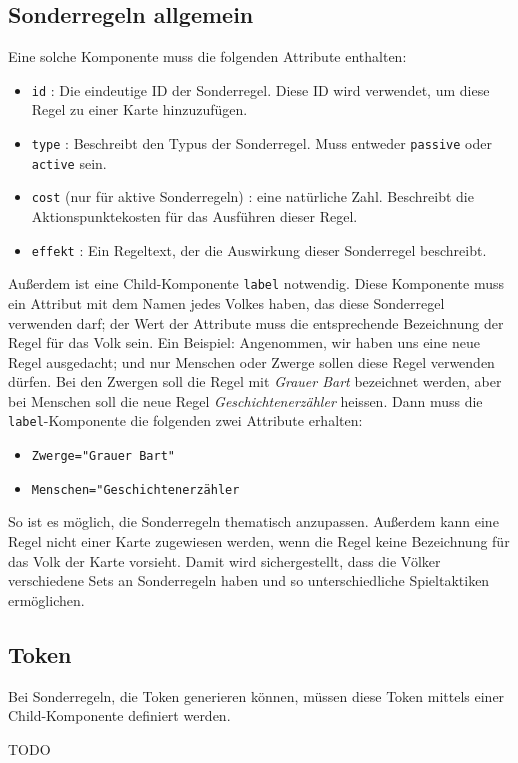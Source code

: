 \documentclass[a4paper,11pt]{report}
\begin{document}
\subsection{Sonderregeln allgemein}
Eine solche Komponente muss die folgenden Attribute enthalten:
\begin{itemize}
	\item \verb+id+ : Die eindeutige ID der Sonderregel. Diese ID wird verwendet, um diese Regel zu einer Karte hinzuzufügen.
	\item \verb+type+ : Beschreibt den Typus der Sonderregel. Muss entweder \verb+passive+ oder \verb+active+ sein.
	\item \verb+cost+ (nur für aktive Sonderregeln) : eine natürliche Zahl. Beschreibt die Aktionspunktekosten für das Ausführen dieser Regel.
	\item \verb+effekt+ : Ein Regeltext, der die Auswirkung dieser Sonderregel beschreibt.
\end{itemize}
Außerdem ist eine Child-Komponente \verb+label+ notwendig. Diese Komponente muss ein Attribut mit dem Namen jedes Volkes haben, das diese Sonderregel verwenden darf; der Wert der Attribute muss die entsprechende Bezeichnung der Regel für das Volk sein. Ein Beispiel: Angenommen, wir haben uns eine neue Regel ausgedacht; und nur Menschen oder Zwerge sollen diese Regel verwenden dürfen. Bei den Zwergen soll die Regel mit \emph{Grauer Bart} bezeichnet werden, aber bei Menschen soll die neue Regel \emph{Geschichtenerzähler} heissen. Dann muss die \verb+label+-Komponente die folgenden zwei Attribute erhalten:
\begin{itemize}
	\item \verb+Zwerge="Grauer Bart"+
	\item \verb+Menschen="Geschichtenerzähler+
\end{itemize}
So ist es möglich, die Sonderregeln thematisch anzupassen. Außerdem kann eine Regel nicht einer Karte zugewiesen werden, wenn die Regel keine Bezeichnung für das Volk der Karte vorsieht. Damit wird sichergestellt, dass die Völker verschiedene Sets an Sonderregeln haben und so unterschiedliche Spieltaktiken ermöglichen.

\subsection{Token}
Bei Sonderregeln, die Token generieren können, müssen diese Token mittels einer Child-Komponente definiert werden.

TODO
\end{document}
